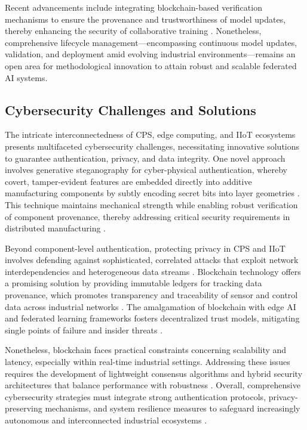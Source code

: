 \documentclass[sigconf]{acmart}
\begin{document}
Recent advancements include integrating blockchain-based verification mechanisms to ensure the provenance and trustworthiness of model updates, thereby enhancing the security of collaborative training \cite{ref38}. Nonetheless, comprehensive lifecycle management—encompassing continuous model updates, validation, and deployment amid evolving industrial environments—remains an open area for methodological innovation to attain robust and scalable federated AI systems.

\subsection{Cybersecurity Challenges and Solutions}

The intricate interconnectedness of CPS, edge computing, and IIoT ecosystems presents multifaceted cybersecurity challenges, necessitating innovative solutions to guarantee authentication, privacy, and data integrity. One novel approach involves generative steganography for cyber-physical authentication, whereby covert, tamper-evident features are embedded directly into additive manufacturing components by subtly encoding secret bits into layer geometries \cite{ref9}. This technique maintains mechanical strength while enabling robust verification of component provenance, thereby addressing critical security requirements in distributed manufacturing \cite{ref13}.

Beyond component-level authentication, protecting privacy in CPS and IIoT involves defending against sophisticated, correlated attacks that exploit network interdependencies and heterogeneous data streams \cite{ref15}. Blockchain technology offers a promising solution by providing immutable ledgers for tracking data provenance, which promotes transparency and traceability of sensor and control data across industrial networks \cite{ref20}. The amalgamation of blockchain with edge AI and federated learning frameworks fosters decentralized trust models, mitigating single points of failure and insider threats \cite{ref22}.

Nonetheless, blockchain faces practical constraints concerning scalability and latency, especially within real-time industrial settings. Addressing these issues requires the development of lightweight consensus algorithms and hybrid security architectures that balance performance with robustness \cite{ref31}. Overall, comprehensive cybersecurity strategies must integrate strong authentication protocols, privacy-preserving mechanisms, and system resilience measures to safeguard increasingly autonomous and interconnected industrial ecosystems \cite{ref32}.
\end{document}
